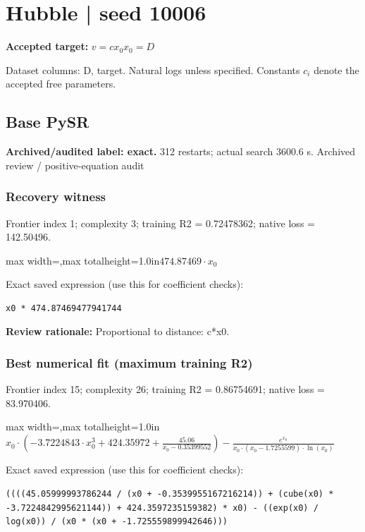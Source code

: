 \documentclass[10pt,letterpaper,landscape]{article}
\begin{document}
\section*{Hubble | seed 10006}
\textbf{Accepted target:} $\displaystyle v=c x_0$\hfill $x_0=D$\par
{\small Dataset columns: D, target. Natural logs unless specified. Constants $c_i$ denote the accepted free parameters.}\par\medskip
\begin{minipage}[t]{0.485\textwidth}
\subsection*{Base PySR}
\textbf{Archived/audited label: exact.} 312 restarts; actual search 3600.6 s.
{\small Archived review / positive-equation audit}
\subsubsection*{Recovery witness}
Frontier index 1; complexity 3; training R2 = 0.72478362; native loss = 142.50496.
\begin{center}\begin{adjustbox}{max width=\linewidth,max totalheight=1.0in}$\displaystyle 474.87469 \cdot x_{0}$\end{adjustbox}\end{center}
{\scriptsize Exact saved expression (use this for coefficient checks):}
\begin{lstlisting}
x0 * 474.87469477941744
\end{lstlisting}
{\small\textbf{Review rationale:} Proportional to distance: c*x0.}
\subsubsection*{Best numerical fit (maximum training R2)}
Frontier index 15; complexity 26; training R2 = 0.86754691; native loss = 83.970406.
\begin{center}\begin{adjustbox}{max width=\linewidth,max totalheight=1.0in}$\displaystyle x_{0} \cdot \left(- 3.7224843 \cdot x_{0}^{3} + 424.35972 + \frac{45.06}{x_{0} - 0.35399552}\right) - \frac{e^{x_{0}}}{x_{0} \cdot \left(x_{0} - 1.7255599\right) \cdot \ln{\left(x_{0} \right)}}$\end{adjustbox}\end{center}
{\scriptsize Exact saved expression (use this for coefficient checks):}
\begin{lstlisting}
((((45.05999993786244 / (x0 + -0.3539955167216214)) + (cube(x0) * -3.7224842995621144)) + 424.3597235159382) * x0) - ((exp(x0) / log(x0)) / (x0 * (x0 + -1.725559899942646)))
\end{lstlisting}
\end{minipage}\hfill
\end{document}
